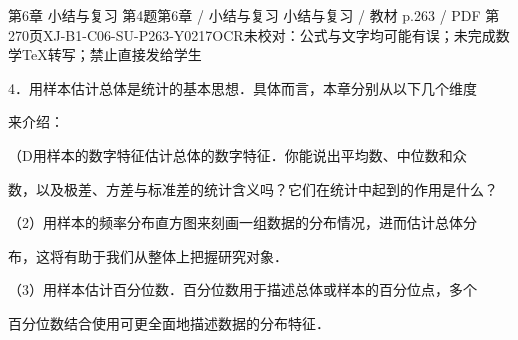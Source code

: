 \begin{bankitem}{第6章 小结与复习 第4题}{第6章 / 小结与复习 小结与复习 / 教材 p.263 / PDF 第270页}{XJ-B1-C06-SU-P263-Y0217}{OCR未校对：公式与文字均可能有误；未完成数学TeX转写；禁止直接发给学生}
\begin{ocrdraft}
\par
4．用样本估计总体是统计的基本思想．具体而言，本章分别从以下几个维度
\par
来介绍：
\par
（D用样本的数字特征估计总体的数字特征．你能说出平均数、中位数和众
\par
数，以及极差、方差与标准差的统计含义吗？它们在统计中起到的作用是什么？
\par
（2）用样本的频率分布直方图来刻画一组数据的分布情况，进而估计总体分
\par
布，这将有助于我们从整体上把握研究对象．
\par
（3）用样本估计百分位数．百分位数用于描述总体或样本的百分位点，多个
\par
百分位数结合使用可更全面地描述数据的分布特征．
\end{ocrdraft}
\end{bankitem}
